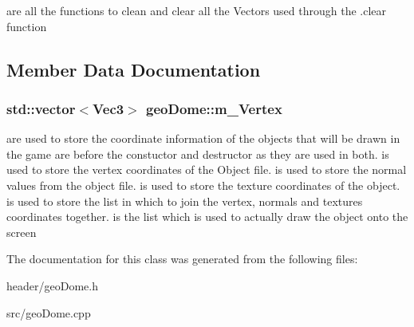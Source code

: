 are all the functions to clean and clear all the Vectors used through the .clear function 

\subsection{Member Data Documentation}
\hypertarget{classgeoDome_a6dd17fd379ccbcbc7c1acd678dc5a358}{
\subsubsection[{m\_\-Vertex}]{\setlength{\rightskip}{0pt plus 5cm}std::vector$<${\bf Vec3}$>$ {\bf geoDome::m\_\-Vertex}}}
\label{classgeoDome_a6dd17fd379ccbcbc7c1acd678dc5a358}
are used to store the coordinate information of the objects that will be drawn in the game  are before the constuctor and destructor as they are used in both.  is used to store the vertex coordinates of the Object file.  is used to store the normal values from the object file.  is used to store the texture coordinates of the object.  is used to store the list in which to join the vertex, normals and textures coordinates together.  is the list which is used to actually draw the object onto the screen 

The documentation for this class was generated from the following files:\begin{DoxyCompactItemize}
\item 
header/geoDome.h\item 
src/geoDome.cpp\end{DoxyCompactItemize}
